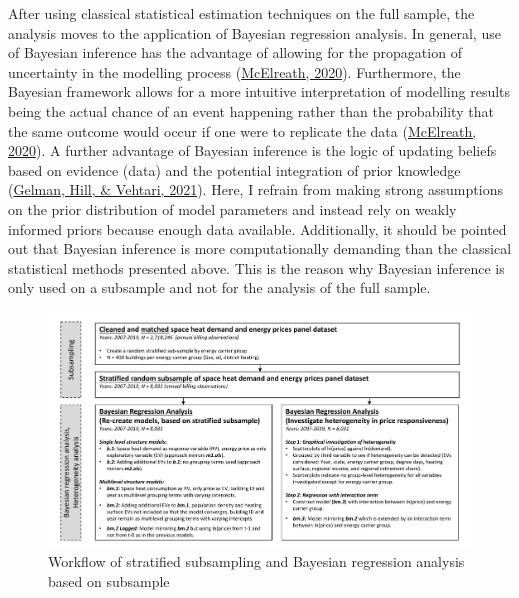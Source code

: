 \documentclass[12pt,twoside]{reedthesis}
\begin{document}
After using classical statistical estimation techniques on the full sample, the analysis moves to the application of Bayesian regression analysis. In general, use of Bayesian inference has the advantage of allowing for the propagation of uncertainty in the modelling process (\protect\hyperlink{ref-mcelreath20}{McElreath, 2020}). Furthermore, the Bayesian framework allows for a more intuitive interpretation of modelling results being the actual chance of an event happening rather than the probability that the same outcome would occur if one were to replicate the data (\protect\hyperlink{ref-mcelreath20}{McElreath, 2020}). A further advantage of Bayesian inference is the logic of updating beliefs based on evidence (data) and the potential integration of prior knowledge (\protect\hyperlink{ref-gelman_etal21}{Gelman, Hill, \& Vehtari, 2021}). Here, I refrain from making strong assumptions on the prior distribution of model parameters and instead rely on weakly informed priors because enough data available. Additionally, it should be pointed out that Bayesian inference is more computationally demanding than the classical statistical methods presented above. This is the reason why Bayesian inference is only used on a subsample and not for the analysis of the full sample.
\begin{figure}

{\centering \includegraphics[width=1.03\linewidth]{figure/workflow_diagramm_part2} 

}

\caption{Workflow of stratified subsampling and Bayesian regression analysis based on subsample}\label{fig:workflow2}
\end{figure}
\end{document}
